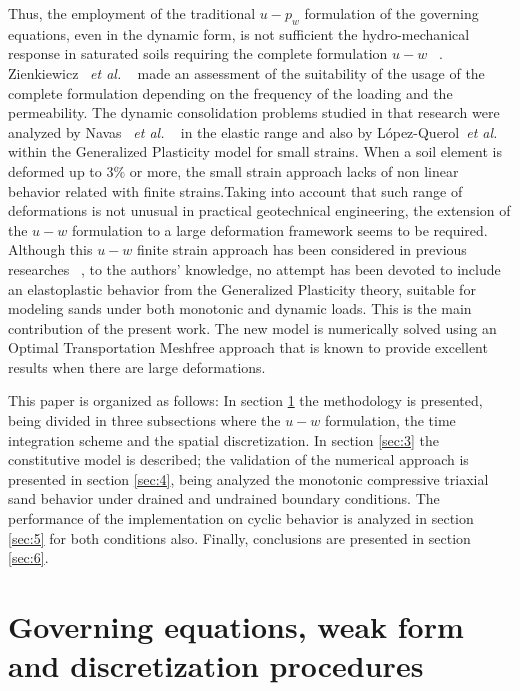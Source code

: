 \documentclass[preprint,12pt,a4paper]{elsarticle}
\begin{document}
Thus, the employment of the traditional $u-p_w$ formulation of the governing equations, even in the dynamic form, is not sufficient  the hydro-mechanical response in saturated soils requiring the complete formulation $u-w$ ~\cite{zienkiewicz1984}. Zienkiewicz ~\textit{et al.} ~\cite{zienkiewicz1980} made an assessment of the suitability of the usage of the complete formulation depending on the frequency of the loading and the permeability. The dynamic consolidation problems studied in that research were analyzed by Navas ~\textit{et al.} ~\cite{Navas2016b} in the elastic range and also by L\'opez-Querol~\textit{et al.} ~\cite{LopezQuerol2008} within the Generalized Plasticity model for small strains. When a soil element is deformed up to $3\%$ or more, the small strain approach lacks of non linear behavior related with finite strains.Taking into account that such range of deformations is not unusual in practical geotechnical engineering, the extension of the $u-w$ formulation to a large deformation framework seems to be required.
Although this $u-w$ finite strain approach has been considered in previous researches ~\cite{Navas2016}, to the authors' knowledge, no attempt has been devoted to include an elastoplastic behavior from the Generalized Plasticity theory, suitable for modeling sands under both monotonic and dynamic loads. This is the main contribution of the present work. The new model is numerically solved using an Optimal Transportation Meshfree approach that is known to provide excellent results when there are large deformations.


This paper is organized as follows:  In section \ref{sec:2} the methodology is presented, being divided in three subsections where the $u-w$ formulation, the time integration scheme and the spatial discretization. In section \ref{sec:3} the constitutive model is described; the validation of the numerical approach is presented in section \ref{sec:4}, being analyzed the monotonic compressive triaxial sand behavior under drained and undrained boundary conditions. The performance of the implementation on cyclic behavior is analyzed in section \ref{sec:5} for both conditions also. Finally, conclusions are presented in section \ref{sec:6}.

\section{Governing equations, weak form and discretization procedures}\label{sec:2}
\end{document}
